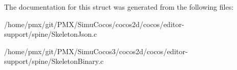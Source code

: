 The documentation for this struct was generated from the following files\+:\begin{DoxyCompactItemize}
\item 
/home/pmx/git/\+P\+M\+X/\+Simu\+Cocos/cocos2d/cocos/editor-\/support/spine/Skeleton\+Json.\+c\item 
/home/pmx/git/\+P\+M\+X/\+Simu\+Cocos3/cocos2d/cocos/editor-\/support/spine/Skeleton\+Binary.\+c\end{DoxyCompactItemize}
